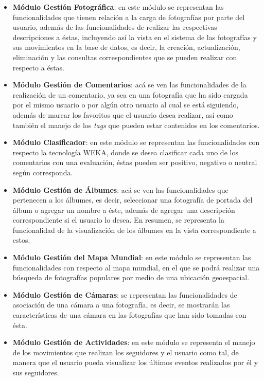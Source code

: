 \documentclass{memoria}
\begin{document}
\begin{itemize}
\item \textbf{Módulo Gestión Fotográfica}: en este módulo se representan las funcionalidades que tienen relación a la carga de fotografías por parte del usuario, además de las funcionalidades de realizar las respectivas descripciones a éstas, incluyendo así la vista en el sistema de las fotografías y sus movimientos en la base de datos, es decir, la creación, actualización, eliminación y las consultas correspondientes que se pueden realizar con respecto a éstas.

\item \textbf{Módulo Gestión de Comentarios}: acá se ven las funcionalidades de la realización de un comentario, ya sea en una fotografía que ha sido cargada por el mismo usuario o por algún otro usuario al cual se está siguiendo, además de marcar los favoritos que el usuario desea realizar, así como también el manejo de los \textsl{tags} que pueden estar contenidos en los comentarios.

\item \textbf{Módulo Clasificador}: en este módulo se representan las funcionalidades con respecto la tecnología WEKA, donde se desea clasificar cada uno de los comentarios con una evaluación, éstas pueden ser positivo, negativo o neutral según corresponda.

\item \textbf{Módulo Gestión de Álbumes}: acá se ven las funcionalidades que pertenecen a los álbumes, es decir, seleccionar una fotografía de portada del álbum o agregar un nombre a éste, además de agregar una descripción correspondiente si el usuario lo desea. En resumen, se representa la funcionalidad de la visualización de los álbumes en la vista correspondiente a estos.

\item \textbf{Módulo Gestión del Mapa Mundial}: en este módulo se representan las funcionalidades con respecto al mapa mundial, en el que se podrá realizar una búsqueda de fotografías populares por medio de una ubicación geoespacial.

\item \textbf{Módulo Gestión de Cámaras}: se representan las funcionalidades de asociación de una cámara a una fotografía, es decir, se mostrarán las características de una cámara en las fotografías que han sido tomadas con ésta.

\item \textbf{Módulo Gestión de Actividades}: en este módulo se representa el manejo de los movimientos que realizan los seguidores y el usuario como tal, de manera que el usuario pueda visualizar los últimos eventos realizados por él y sus seguidores.


\end{itemize}
\end{document}
